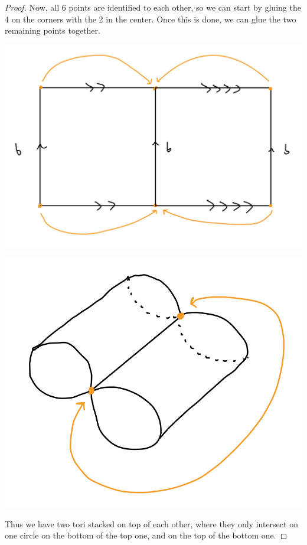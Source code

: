 \documentclass[12pt]{article}
\begin{document}
\begin{proof}
  \par Now, all 6 points are identified to each other, so we can start by gluing the 4 on the corners with the 2 in the center. 
  Once this is done, we can glue the two remaining points together.
  \par \begin{center} \includegraphics[scale=.2]{4-3.jpg} \end{center}
  \par \begin{center} \includegraphics[scale=.2]{4-4.jpg} \end{center} 
  \par Thus we have two tori stacked on top of each other, where they only intersect on one circle on the bottom of the top one, and on the top of the bottom one. 

\end{proof}
\end{document}
